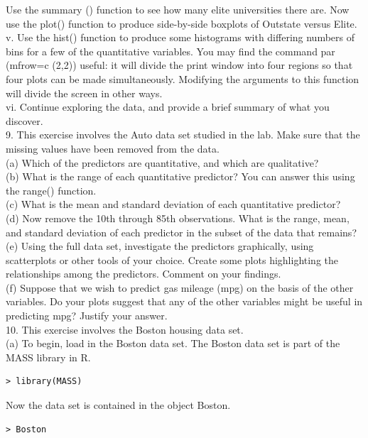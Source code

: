 \documentclass[10pt]{article}
\begin{document}
Use the summary () function to see how many elite universities there are. Now use the plot() function to produce side-by-side boxplots of Outstate versus Elite.\\
v. Use the hist() function to produce some histograms with differing numbers of bins for a few of the quantitative variables. You may find the command par (mfrow=c (2,2)) useful: it will divide the print window into four regions so that four plots can be made simultaneously. Modifying the arguments to this function will divide the screen in other ways.\\
vi. Continue exploring the data, and provide a brief summary of what you discover.\\
9. This exercise involves the Auto data set studied in the lab. Make sure that the missing values have been removed from the data.\\
(a) Which of the predictors are quantitative, and which are qualitative?\\
(b) What is the range of each quantitative predictor? You can answer this using the range() function.\\
(c) What is the mean and standard deviation of each quantitative predictor?\\
(d) Now remove the 10th through 85th observations. What is the range, mean, and standard deviation of each predictor in the subset of the data that remains?\\
(e) Using the full data set, investigate the predictors graphically, using scatterplots or other tools of your choice. Create some plots highlighting the relationships among the predictors. Comment on your findings.\\
(f) Suppose that we wish to predict gas mileage (mpg) on the basis of the other variables. Do your plots suggest that any of the other variables might be useful in predicting mpg? Justify your answer.\\
10. This exercise involves the Boston housing data set.\\
(a) To begin, load in the Boston data set. The Boston data set is part of the MASS library in R.

\begin{verbatim}
> library(MASS)
\end{verbatim}

Now the data set is contained in the object Boston.

\begin{verbatim}
> Boston
\end{verbatim}
\end{document}
